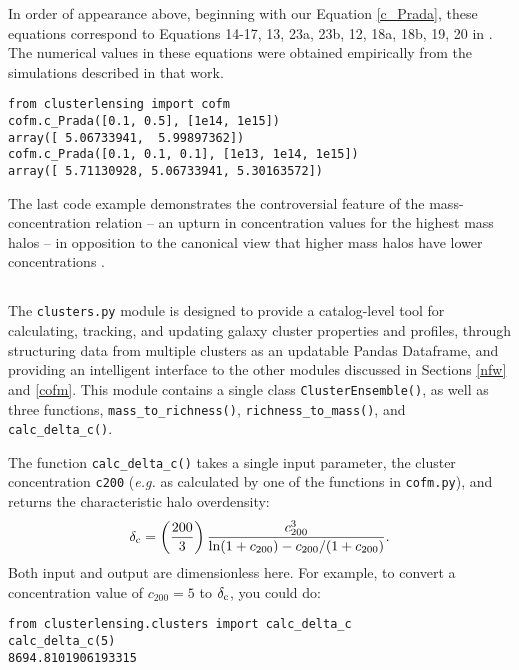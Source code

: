 \documentclass{emulateapj}
\newcommand{\code}{\lstinline[style=codeintext]}
\newcommand{\hcode}{\large\normalfont\texttt} %
\begin{document}
In order of appearance above, beginning with our Equation \ref{c_Prada}, these equations correspond to Equations 14-17, 13, 23a, 23b, 12, 18a, 18b, 19, 20 in \citet{Prada12}. The numerical values in these equations were obtained empirically from the simulations described in that work.
\begin{lstlisting}
from clusterlensing import cofm
cofm.c_Prada([0.1, 0.5], [1e14, 1e15])
array([ 5.06733941,  5.99897362])
cofm.c_Prada([0.1, 0.1, 0.1], [1e13, 1e14, 1e15])
array([ 5.71130928, 5.06733941, 5.30163572])
\end{lstlisting}
The last code example demonstrates the controversial feature of the \citet{Prada12} mass-concentration relation -- an upturn in concentration values for the highest mass halos -- in opposition to the canonical view that higher mass halos have lower concentrations \citep{nfw96, nfw97, Jing00, Bullock01}.



\subsection{\normalfont{\hcode{clusters.py}}}
\label{clusters}
The \code{clusters.py} module is designed to provide a catalog-level tool for calculating, tracking, and updating galaxy cluster properties and profiles, through structuring data from multiple clusters as an updatable Pandas Dataframe, and providing an intelligent interface to the other modules discussed in Sections \ref{nfw} and \ref{cofm}. This module contains a single class \code{ClusterEnsemble()}, as well as three functions, \code{mass_to_richness()}, \code{richness_to_mass()}, and \code{calc_delta_c()}.

The function \code{calc_delta_c()} takes a single input parameter, the cluster concentration \code{c200} (\emph{e.g.} as calculated by one of the functions in \code{cofm.py}), and returns the characteristic halo overdensity:
\begin{equation}
\delta_{\rm c} = \left( \frac{200}{3} \right) \frac{c_{200}^3}{\ln(1 + c_{200}) - c_{200}/(1 + c_{200})}.
\end{equation}
Both input and output are dimensionless here. For example, to convert a concentration value of $c_{200} = 5$ to $\delta_{\rm c}$, you could do:
\begin{lstlisting}
from clusterlensing.clusters import calc_delta_c
calc_delta_c(5)
8694.8101906193315
\end{lstlisting}
\end{document}

